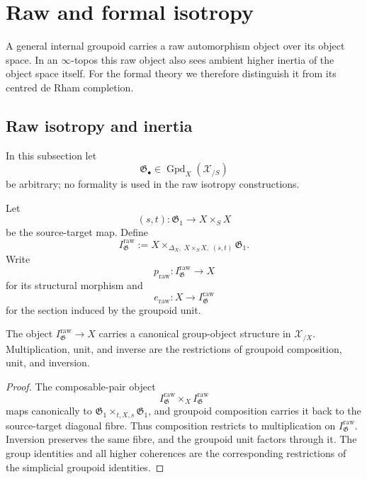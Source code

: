 \section{Raw and formal isotropy}
\label{sec:flg-isotropy}

A general internal groupoid carries a raw automorphism object over its object
space.  In an $\infty$-topos this raw object also sees ambient higher inertia
of the object space itself.  For the formal theory we therefore distinguish it
from its centred de Rham completion.

\subsection{Raw isotropy and inertia}

In this subsection let
\[
    \mathfrak G_\bullet\in
    \operatorname{Gpd}_X(\mathcal X_{/S})
\]
be arbitrary; no formality is used in the raw isotropy constructions.

\begin{definition}
\label{def:raw-isotropy-group}
Let
\[
    (s,t):
    \mathfrak G_1\longrightarrow X\times_SX
\]
be the source-target map.  Define
\[
    I^{\mathrm{raw}}_{\mathfrak G}
    :=
    X\times_{\Delta_X,\;X\times_SX,\;(s,t)}
    \mathfrak G_1.
\]
Write
\[
    p_{\mathrm{raw}}:
    I^{\mathrm{raw}}_{\mathfrak G}\to X
\]
for its structural morphism and
\[
    e_{\mathrm{raw}}:
    X\longrightarrow I^{\mathrm{raw}}_{\mathfrak G}
\]
for the section induced by the groupoid unit.
\end{definition}

\begin{proposition}
\label{prop:raw-isotropy-group}
The object
$I^{\mathrm{raw}}_{\mathfrak G}\to X$
carries a canonical group-object structure in $\mathcal X_{/X}$.
Multiplication, unit, and inverse are the restrictions of groupoid
composition, unit, and inversion.
\end{proposition}

\begin{proof}
The composable-pair object
\[
    I^{\mathrm{raw}}_{\mathfrak G}
    \times_X
    I^{\mathrm{raw}}_{\mathfrak G}
\]
maps canonically to
$\mathfrak G_1\times_{t,X,s}\mathfrak G_1$, and groupoid composition carries
it back to the source-target diagonal fibre.  Thus composition restricts to
multiplication on $I^{\mathrm{raw}}_{\mathfrak G}$.  Inversion preserves the
same fibre, and the groupoid unit factors through it.  The group identities
and all higher coherences are the corresponding restrictions of the
simplicial groupoid identities.
\end{proof}

